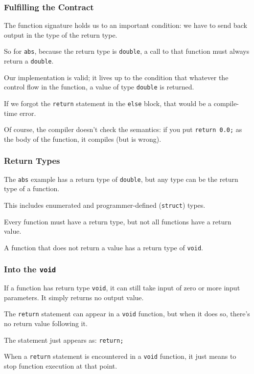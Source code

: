\begin{frame}
\frametitle{Fulfilling the Contract}

The function signature holds us to an important condition: we have to send back output in the type of the return type.

So for \texttt{abs}, because the return type is \texttt{double}, a call to that function must always return a \texttt{double}.


Our implementation is valid; it lives up to the condition that whatever the control flow in the function, a value of type \texttt{double} is returned.

If we forgot the \texttt{return} statement in the \texttt{else} block, that would be a compile-time error.

Of course, the compiler doesn't check the semantics: if you put \texttt{return 0.0;} as the body of the function, it compiles (but is wrong).

\end{frame}

\begin{frame}
\frametitle{Return Types}
The \texttt{abs} example has a return type of \texttt{double}, but any type can be the return type of a function.

This includes enumerated and programmer-defined (\texttt{struct}) types.

Every function must have a return type, but not all functions have a return value.

A function that does not return a value has a return type of \texttt{void}.

\end{frame}

\begin{frame}
\frametitle{Into the \texttt{void}}
If a function has return type \texttt{void}, it can still take input of zero or more input parameters. It simply returns no output value.

The \texttt{return} statement can appear in a \texttt{void} function, but when it does so, there's no return value following it.

The statement just appears as: \texttt{return;}

When a \texttt{return} statement is encountered in a \texttt{void} function, it just means to stop function execution at that point.

\end{frame}

